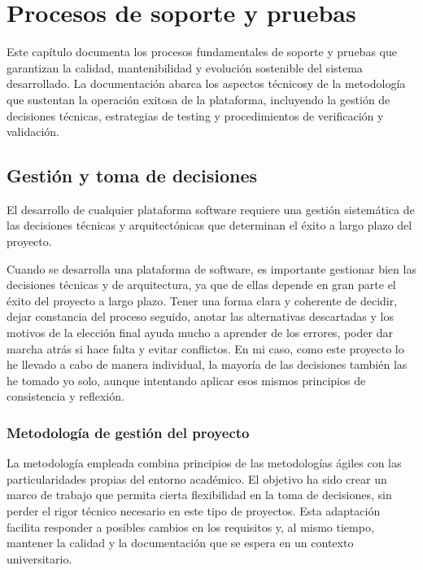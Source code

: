 \documentclass[12pt,a4paper,oneside]{report}
\begin{document}
\chapter{Procesos de soporte y
pruebas}\label{procesos-de-soporte-y-pruebas}

Este capítulo documenta los procesos fundamentales de soporte y pruebas que garantizan la calidad, mantenibilidad y evolución sostenible del sistema desarrollado. La documentación abarca los aspectos técnicosy de la metodología que sustentan la operación exitosa de la plataforma, incluyendo la gestión de decisiones técnicas, estrategias de testing y procedimientos de verificación y validación.

\section{Gestión y toma de
decisiones}\label{gestiuxf3n-y-toma-de-decisiones}

El desarrollo de cualquier plataforma software requiere una gestión sistemática de las decisiones técnicas y arquitectónicas que determinan el éxito a largo plazo del proyecto.

Cuando se desarrolla una plataforma de software, es importante gestionar bien las decisiones técnicas y de arquitectura, ya que de ellas depende en gran parte el éxito del proyecto a largo plazo. Tener una forma clara y coherente de decidir, dejar constancia del proceso seguido, anotar las alternativas descartadas y los motivos de la elección final ayuda mucho a aprender de los errores, poder dar marcha atrás si hace falta y evitar conflictos. En mi caso, como este proyecto lo he llevado a cabo de manera individual, la mayoría de las decisiones también las he tomado yo solo, aunque intentando aplicar esos mismos principios de consistencia y reflexión.

\subsection{Metodología de gestión del
proyecto}\label{metodologuxeda-de-gestiuxf3n-del-proyecto}

La metodología empleada combina principios de las metodologías ágiles con las particularidades propias del entorno académico. El objetivo ha sido crear un marco de trabajo que permita cierta flexibilidad en la toma de decisiones, sin perder el rigor técnico necesario en este tipo de proyectos. Esta adaptación facilita responder a posibles cambios en los requisitos y, al mismo tiempo, mantener la calidad y la documentación que se espera en un contexto universitario.
\end{document}
